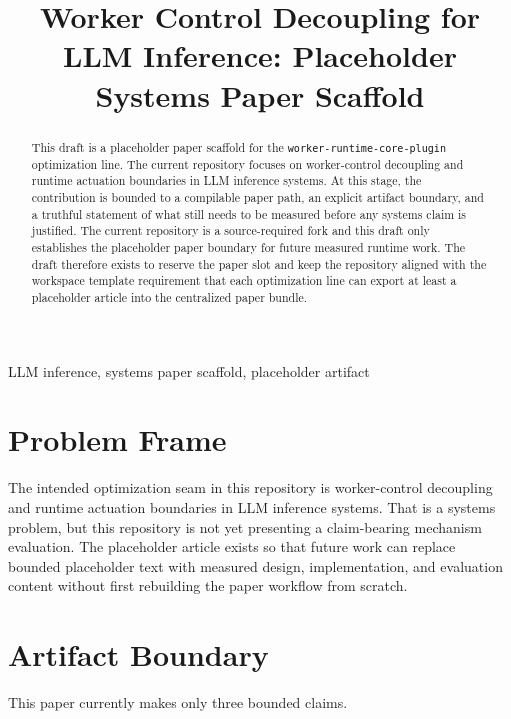 \documentclass[conference]{IEEEtran}
\begin{document}
\title{Worker Control Decoupling for LLM Inference: Placeholder Systems Paper Scaffold}

\author{}

\maketitle

\begin{abstract}
This draft is a placeholder paper scaffold for the \texttt{worker-runtime-core-plugin} optimization line. The current repository focuses on worker-control decoupling and runtime actuation boundaries in LLM inference systems. At this stage, the contribution is bounded to a compilable paper path, an explicit artifact boundary, and a truthful statement of what still needs to be measured before any systems claim is justified. The current repository is a source-required fork and this draft only establishes the placeholder paper boundary for future measured runtime work. The draft therefore exists to reserve the paper slot and keep the repository aligned with the workspace template requirement that each optimization line can export at least a placeholder article into the centralized paper bundle.
\end{abstract}

\begin{IEEEkeywords}
LLM inference, systems paper scaffold, placeholder artifact
\end{IEEEkeywords}

\section{Problem Frame}

The intended optimization seam in this repository is worker-control decoupling and runtime actuation boundaries in LLM inference systems. That is a systems problem, but this repository is not yet presenting a claim-bearing mechanism evaluation. The placeholder article exists so that future work can replace bounded placeholder text with measured design, implementation, and evaluation content without first rebuilding the paper workflow from scratch.

\section{Artifact Boundary}

This paper currently makes only three bounded claims.
\end{document}
